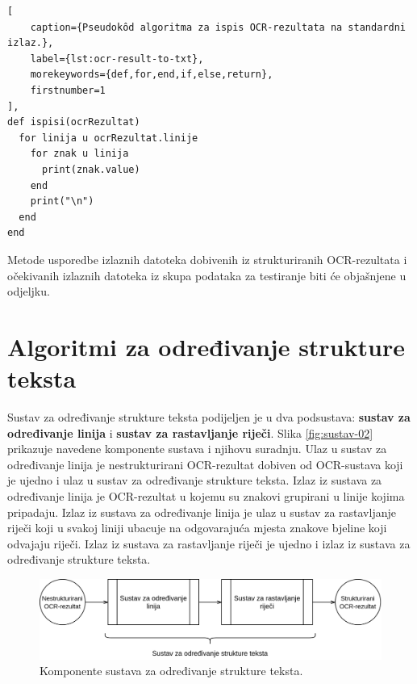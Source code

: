 \documentclass[times, utf8, zavrsni]{fer}
\begin{document}
\begin{lstlisting}[
    caption={Pseudokôd algoritma za ispis OCR-rezultata na standardni izlaz.},
    label={lst:ocr-result-to-txt},
    morekeywords={def,for,end,if,else,return},
    firstnumber=1
],
def ispisi(ocrRezultat)
  for linija u ocrRezultat.linije
    for znak u linija
      print(znak.value)
    end
    print("\n")
  end
end
\end{lstlisting}

Metode usporedbe izlaznih datoteka dobivenih iz strukturiranih OCR-rezultata i
očekivanih izlaznih datoteka iz skupa podataka za testiranje biti će objašnjene
u odjeljku.
















\chapter{Algoritmi za određivanje strukture teksta}
Sustav za određivanje strukture teksta podijeljen je u dva podsustava:
\textbf{sustav za određivanje linija} i \textbf{sustav za rastavljanje riječi}.
Slika \ref{fig:sustav-02} prikazuje navedene komponente sustava i njihovu
suradnju. Ulaz u sustav za određivanje linija je nestrukturirani OCR-rezultat
dobiven od OCR-sustava koji je ujedno i ulaz u sustav za određivanje strukture
teksta. Izlaz iz sustava za određivanje linija je OCR-rezultat
u kojemu su znakovi grupirani u linije kojima pripadaju. Izlaz
iz sustava za određivanje linija je ulaz u sustav za rastavljanje riječi koji
u svakoj liniji ubacuje na odgovarajuća mjesta znakove bjeline koji odvajaju
riječi. Izlaz iz sustava za rastavljanje riječi je ujedno i izlaz iz sustava
za određivanje strukture teksta.
\begin{figure}[htb]
    \centering
    \captionsetup{justification=centering,margin=2cm}
    \includegraphics[width=\textwidth]{images/sustav-03.png}
    \caption{
        Komponente sustava za određivanje strukture teksta.
    }
    \label{fig:sustav-03}
\end{figure}
\end{document}
